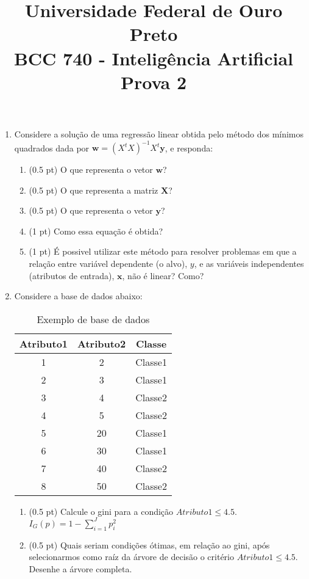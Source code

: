 \documentclass{article}
\title{\vspace{-2 cm} Universidade Federal de Ouro Preto \\ BCC 740 - Inteligência Artificial \\ Prova 2}
\date{}
\begin{document}
\maketitle

\vspace{-2 cm}
\begin{enumerate}

\item Considere a solução de uma regressão linear obtida pelo método dos mínimos quadrados dada por $\mathbf{w} = (X^{t}X)^{-1}X^t\mathbf{y}$, e responda:
\begin{enumerate}
    \item (0.5 pt) O que representa o vetor $\mathbf{w}$?
    \item (0.5 pt) O que representa a matriz $\mathbf{X}$?
    \item (0.5 pt) O que representa o vetor $\mathbf{y}$?
    \item (1 pt) Como essa equação é obtida?
    \item (1 pt) É possivel utilizar este método para resolver problemas em que a relação entre variável dependente (o alvo), $y$, e as variáveis independentes (atributos de entrada), $\mathbf{x}$, não é linear? Como?  
\end{enumerate}

\item Considere a base de dados abaixo:

\begin{table}[h!]
    \footnotesize
    \centering
    \begin{tabular}{|c|c|c|}
    \hline
    \textbf{Atributo1} & \textbf{Atributo2} & \textbf{Classe} \\
    \hline
    1 & 2 & Classe1 \\
    2 & 3 & Classe1 \\
    3 & 4 & Classe2 \\
    4 & 5 & Classe2 \\
    5 & 20 & Classe1 \\
    6 & 30 & Classe1 \\
    7 & 40 & Classe2 \\
    8 & 50 & Classe2 \\
    \hline
    \end{tabular}
    \caption{Exemplo de base de dados}
    \label{tab:exemplo}
\end{table}

\begin{enumerate}
    \item (0.5 pt) Calcule o gini para a condição $Atributo1 \leq 4.5$. $I_{G}(p) = 1 - \sum_{i=1}^{J} p_{i}^{2}$
    \item (0.5 pt) Quais seriam condições ótimas, em relação ao gini, após selecionarmos como raíz da árvore de decisão o critério $Atributo1 \leq 4.5$. Desenhe a árvore completa.
\end{enumerate}


\end{enumerate}
\end{document}
